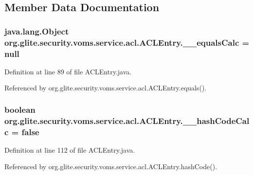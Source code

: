 \subsection{Member Data Documentation}
\hypertarget{classorg_1_1glite_1_1security_1_1voms_1_1service_1_1acl_1_1ACLEntry_adc2f46e0774a81b353d20519a2864184}{
\subsubsection[{\_\-\_\-equalsCalc}]{\setlength{\rightskip}{0pt plus 5cm}java.lang.Object {\bf org.glite.security.voms.service.acl.ACLEntry.\_\-\_\-equalsCalc} = null}}
\label{classorg_1_1glite_1_1security_1_1voms_1_1service_1_1acl_1_1ACLEntry_adc2f46e0774a81b353d20519a2864184}


Definition at line 89 of file ACLEntry.java.



Referenced by org.glite.security.voms.service.acl.ACLEntry.equals().

\hypertarget{classorg_1_1glite_1_1security_1_1voms_1_1service_1_1acl_1_1ACLEntry_a34984bc632d0e0119c52d047bc583c02}{
\subsubsection[{\_\-\_\-hashCodeCalc}]{\setlength{\rightskip}{0pt plus 5cm}boolean {\bf org.glite.security.voms.service.acl.ACLEntry.\_\-\_\-hashCodeCalc} = false}}
\label{classorg_1_1glite_1_1security_1_1voms_1_1service_1_1acl_1_1ACLEntry_a34984bc632d0e0119c52d047bc583c02}


Definition at line 112 of file ACLEntry.java.



Referenced by org.glite.security.voms.service.acl.ACLEntry.hashCode().


